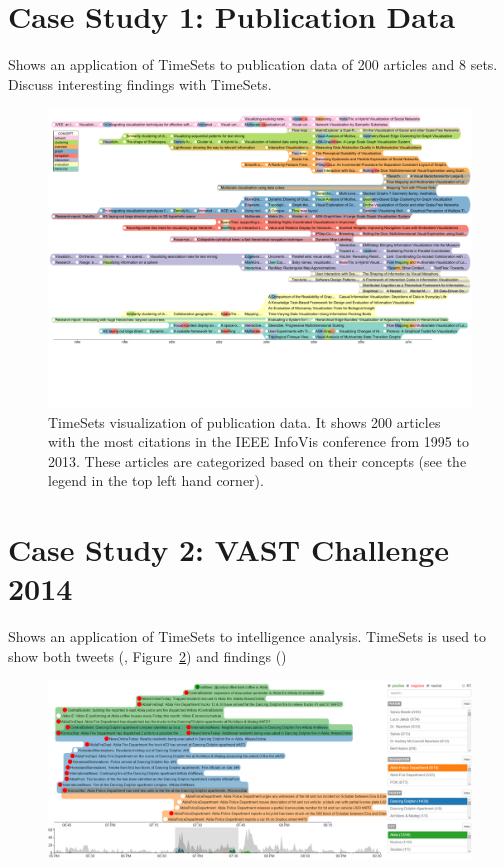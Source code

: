 \section{Case Study 1: Publication Data}
Shows an application of TimeSets to publication data of 200 articles and 8 sets. Discuss interesting findings with TimeSets.

\begin{figure}[!htb]
	\centering
	\includegraphics[width=\linewidth]{figure13}
	\caption{TimeSets visualization of publication data. It shows 200 articles with the most citations in the IEEE InfoVis conference from 1995 to 2013. These articles are categorized based on their concepts (see the legend in the top left hand corner).}
	\label{fig:citations}
\end{figure}

\section{Case Study 2: VAST Challenge 2014}
Shows an application of TimeSets to intelligence analysis. TimeSets is used to show both tweets (, Figure~\ref{fig:savi}) and findings ()

\begin{figure}[!htb]
	\centering
	\includegraphics[width=\linewidth]{HQ-savi}
	\caption{}
	\label{fig:savi}
\end{figure}

